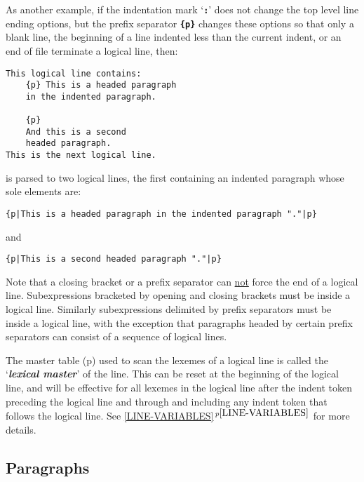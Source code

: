 \documentclass[12pt]{article}
\newcommand{\TT}[1]{{\tt \bfseries #1}}
\newcommand{\key}[1]{{\bf \em #1}\index{#1}}
\newcommand{\itemref}[1]{\ref{#1}$\,^{p\pageref{#1}}$}
\newcommand{\pagref}[1]{p\pageref{#1}}
\newenvironment{indpar}[1][0.3in]%
	{\begin{list}{}%
		     {\setlength{\itemsep}{0in}%
		      \setlength{\topsep}{0in}%
		      \setlength{\parsep}{1ex}%
		      \setlength{\labelwidth}{#1}%
		      \setlength{\leftmargin}{#1}%
		      \addtolength{\leftmargin}{\labelsep}}%
	 \item}%
	{\end{list}}
\begin{document}
As another example, if the indentation mark `\TT{:}' does not
change the top level line ending options, but
the prefix separator \TT{\{p\}} changes these
options so that only a blank line, the beginning of a
line indented less than the current indent, or an end of file
terminate a logical line,
then:
\begin{indpar}\begin{verbatim}
This logical line contains:
    {p} This is a headed paragraph
    in the indented paragraph.

    {p}
    And this is a second
    headed paragraph.
This is the next logical line.
\end{verbatim}\end{indpar}

is parsed to two logical lines, the first containing an indented paragraph
whose sole elements are:
\begin{indpar}\small\begin{verbatim}
{p|This is a headed paragraph in the indented paragraph "."|p}
\end{verbatim}\end{indpar}

and

\begin{indpar}\begin{verbatim}
{p|This is a second headed paragraph "."|p}
\end{verbatim}\end{indpar}

Note that a closing bracket or a prefix separator can \underline{not}
force the end of a logical line.  Subexpressions bracketed by opening
and closing brackets must be inside a logical line.  Similarly subexpressions
delimited by prefix separators must be inside a logical line, with the
exception that paragraphs headed by certain prefix separators can
consist of a sequence of logical lines.

The master table (\pagref{MASTER-TABLE})
used to scan the lexemes of a logical line
is called the `\key{lexical master}'\label{LEXICAL-MASTER} of the line.
This can be reset at the beginning of the logical line,
and will be effective for all lexemes in the logical line after the indent token
preceding the logical line and through and including any indent token
that follows the logical line.
See \itemref{LINE-VARIABLES} for more details.

\subsection{Paragraphs}
\label{PARAGRAPHS}
\end{document}
